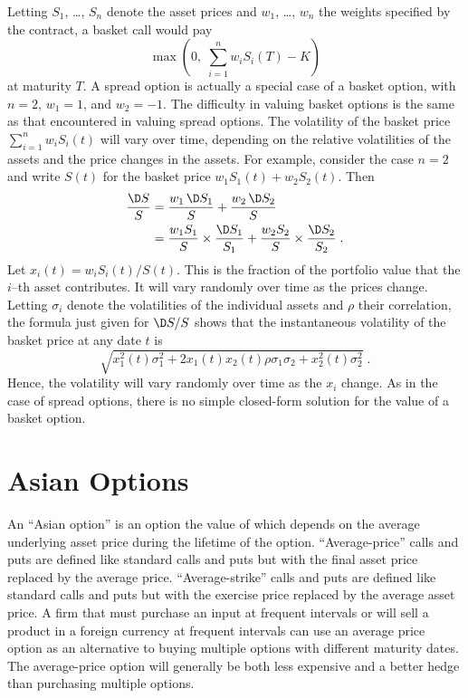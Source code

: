 Letting $S_1$, \ldots, $S_n$ denote the asset prices and $w_1$, \ldots, $w_n$ the weights specified by the contract, a basket call would pay
$$\max\left(0,\;\sum_{i=1}^n w_iS_i(T) - K\right)$$
at maturity $T$.  A spread option is actually a special case of a basket option, with $n=2$, $w_1=1$, and $w_2=-1$.  The difficulty in valuing basket options is the same as that encountered in valuing spread options.  The volatility of the basket price $\sum_{i=1}^nw_iS_i(t)$ will vary over time, depending on the relative volatilities of the assets and the price changes in the assets.  For example, consider the case $n=2$ and write $S(t)$ for the basket price $w_1S_1(t)+w_2S_2(t)$.  Then
\begin{align*}
\frac{\D S}{S} &= \frac{w_1\,\D S_1}{S} + \frac{w_2\,\D S_2}{S}\\
&=\frac{w_1S_1}{S}\times \frac{\D S_1}{S_1} + \frac{w_2S_2}{S}\times \frac{\D S_2}{S_2}\;.
\end{align*}
Let $x_i(t)=w_iS_i(t)/S(t)$.  This is the fraction of the portfolio value that the $i$--th asset contributes.  It will vary randomly over time as the prices change.  Letting $\sigma_i$ denote the volatilities of the individual assets and $\rho$ their correlation, the formula just given for $\D S/S$ shows that the instantaneous volatility of the basket price at any date $t$ is
$$\sqrt{x_1^2(t)\sigma_1^2 + 2x_1(t)x_2(t)\rho\sigma_1\sigma_2 + x_2^2(t)\sigma_2^2}\; .$$
Hence, the volatility will vary randomly over time as the $x_i$ change.  As in the case of spread options, there is no simple closed-form solution for the value of a basket option.

\section{Asian Options}\label{s_asians}

An ``Asian option''    is an option the value of which depends on the average underlying asset price during the lifetime of the option.  ``Average-price'' calls and puts are defined like standard calls and puts but with the final asset price replaced by the average price.  ``Average-strike'' calls and puts are defined like standard calls and puts but with the exercise price replaced by the average asset price.   A firm that must purchase an input at frequent intervals or will sell a product in a foreign currency at frequent intervals can use an average price option as an alternative to buying multiple options with different maturity dates.  The average-price option will generally be both less expensive and a better hedge than purchasing multiple options.

